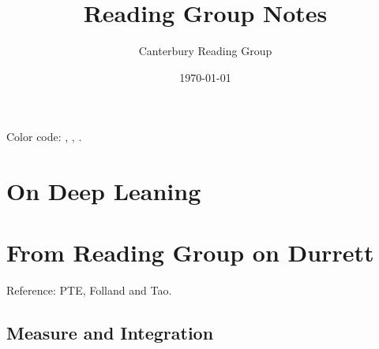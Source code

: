 \documentclass[12pt, oneside]{book}
\begin{document}
    \title{Reading Group Notes}\author{Canterbury Reading Group}\date{\today}
    \tableofcontents
    Color code:  , , . 
    \chapter{On Deep Leaning}
    
    \chapter{From Reading Group on Durrett} Reference: PTE, Folland and Tao. 
        \section{Measure and Integration}

\end{document}
